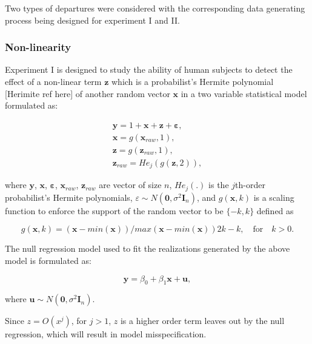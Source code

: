 \documentclass[]{interact}
\theoremstyle{plain}%
\theoremstyle{definition}
\theoremstyle{remark}
\begin{document}
Two types of departures were considered with the corresponding data
generating process being designed for experiment I and II.

\hypertarget{non-linearity}{%
\subsubsection{Non-linearity}\label{non-linearity}}

Experiment I is designed to study the ability of human subjects to
detect the effect of a non-linear term \(\boldsymbol{z}\) which is a
probabilist's Hermite polynomial {[}Herimite ref here{]} of another
random vector \(\boldsymbol{x}\) in a two variable statistical model
formulated as:

\begin{align} \label{eq:nonlinearity-model}
\boldsymbol{y} = 1 + \boldsymbol{x} + \boldsymbol{z} + \boldsymbol{\varepsilon},\\
\boldsymbol{x} = g(\boldsymbol{x}_{raw}, 1), \\
\boldsymbol{z} = g(\boldsymbol{z}_{raw}, 1), \\
\boldsymbol{z}_{raw} = He_j(g(\boldsymbol{z}, 2)),
\end{align}

where \(\boldsymbol{y}\), \(\boldsymbol{x}\),
\(\boldsymbol{\varepsilon}\), \(\boldsymbol{x}_{raw}\),
\(\boldsymbol{z}_{raw}\) are vector of size \(n\), \(He_{j}(.)\) is the
\(j\)th-order probabilist's Hermite polynomials,
\(\varepsilon \sim N(\boldsymbol{0}, \sigma^2\boldsymbol{I}_n)\), and
\(g(\boldsymbol{x}, k)\) is a scaling function to enforce the support of
the random vector to be \(\{-k, k\}\) defined as

\begin{equation} \label{eq:scaling-function}
g(\boldsymbol{x}, k) = (\boldsymbol{x} - min(\boldsymbol{x}))/max(\boldsymbol{x} - min(\boldsymbol{x}))2k - k, \quad \text{for} \quad k > 0. 
\end{equation}

The null regression model used to fit the realizations generated by the
above model is formulated as:

\begin{equation} \label{eq:null-model}
\boldsymbol{y} = \beta_0 + \beta_1 \boldsymbol{x} + \boldsymbol{u},
\end{equation}

where
\(\boldsymbol{u} \sim N(\boldsymbol{0}, \sigma^2\boldsymbol{I}_n)\).

Since \(z = O(x^j)\), for \(j > 1\), \(z\) is a higher order term leaves
out by the null regression, which will result in model misspecification.
\end{document}
